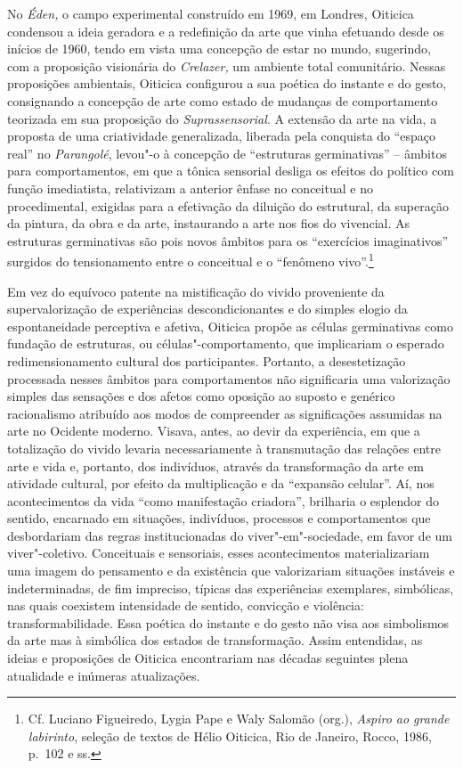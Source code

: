 No \emph{Éden,} o campo experimental construído em 1969, em Londres,
Oiticica condensou a ideia geradora e a redefinição da arte que vinha
efetuando desde os inícios de 1960, tendo em vista uma concepção de
estar no mundo, sugerindo, com a proposição visionária do
\emph{Crelazer,} um ambiente total comunitário. Nessas proposições
ambientais, Oiticica configurou a sua poética do instante e do gesto,
consignando a concepção de arte como estado de mudanças de comportamento
teorizada em sua proposição do \emph{Suprassensorial}. A extensão da
arte na vida, a proposta de uma criatividade generalizada, liberada pela
conquista do ``espaço real'' no \emph{Parangolé}, levou"-o à concepção de
``estruturas germinativas'' -- âmbitos para comportamentos, em que a
tônica sensorial desliga os efeitos do político com função imediatista,
relativizam a anterior ênfase no conceitual e no procedimental, exigidas
para a efetivação da diluição do estrutural, da superação da pintura, da
obra e da arte, instaurando a arte nos fios do vivencial. As estruturas
germinativas são pois novos âmbitos para os ``exercícios imaginativos''
surgidos do tensionamento entre o conceitual e o ``fenômeno
vivo''.\footnote{Cf. Luciano Figueiredo, Lygia Pape e Waly Salomão
(org.), \emph{Aspiro ao grande labirinto}, seleção de textos de Hélio
Oiticica, Rio de Janeiro, Rocco, 1986, p.~102 e ss.}

Em vez do equívoco patente na mistificação do vivido proveniente da
supervalorização de experiências descondicionantes e do simples elogio
da espontaneidade perceptiva e afetiva, Oiticica propõe as células
germinativas como fundação de estruturas, ou células"-comportamento, que
implicariam o esperado redimensionamento cultural dos participantes.
Portanto, a desestetização processada nesses âmbitos para comportamentos
não significaria uma valorização simples das sensações e dos afetos como
oposição ao suposto e genérico racionalismo atribuído aos modos de
compreender as significações assumidas na arte no Ocidente moderno.
Visava, antes, ao devir da experiência, em que a totalização do vivido
levaria necessariamente à transmutação das relações entre arte e vida e,
portanto, dos indivíduos, através da transformação da arte em atividade
cultural, por efeito da multiplicação e da ``expansão celular''. Aí, nos
acontecimentos da vida ``como manifestação criadora'', brilharia o
esplendor do sentido, encarnado em situações, indivíduos, processos e
comportamentos que desbordariam das regras institucionadas do
viver"-em"-sociedade, em favor de um viver"-coletivo. Conceituais e
sensoriais, esses acontecimentos materializariam uma imagem do
pensamento e da existência que valorizariam situações instáveis e
indeterminadas, de fim impreciso, típicas das experiências exemplares,
simbólicas, nas quais coexistem intensidade de sentido, convicção e
violência: transformabilidade. Essa poética do instante e do gesto não
visa aos simbolismos da arte mas à simbólica dos estados de
transformação. Assim entendidas, as ideias e proposições de Oiticica
encontrariam nas décadas seguintes plena atualidade e inúmeras
atualizações.

